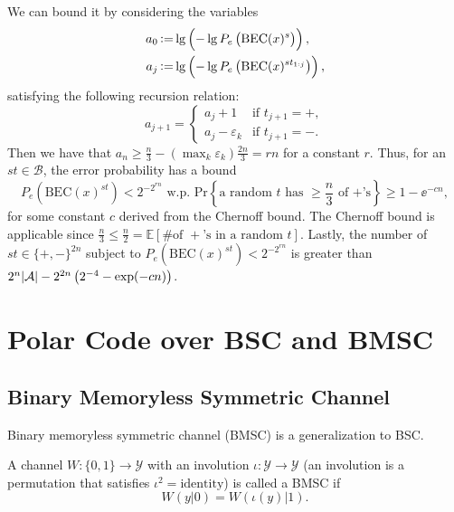 \begin{example}
    We can bound it by considering the variables
    \begin{equation}\begin{aligned}
        a_0 &\operatorname{\vcentcolon=} \lg\left(-\lg P_e\left(\mathrm{BEC}(x)^s\right)\right), \\
        a_j &\operatorname{\vcentcolon=} \lg\left(-\lg P_e\left(\mathrm{BEC}(x)^{st_{1:j}}\right)\right),
    \end{aligned}\end{equation}
    satisfying the following recursion relation:
    \begin{equation}
        a_{j+1} = \begin{cases}
            a_j + 1 &\text{if }t_{j+1}=+, \\
            a_j - \varepsilon_k &\text{if }t_{j+1}=-.
        \end{cases}
    \end{equation}
    Then we have that $a_n\ge\frac{n}{3} - (\max_k\varepsilon_k)\frac{2n}{3} = rn$ for a constant $r$. Thus, for an $st\in\mathcal{B}$, the error probability has a bound
    \begin{equation*}
        P_e\left(\mathrm{BEC}(x)^{st}\right) < 2^{-2^{rn}} \text{ w.p. }\mathrm{Pr}\left\{\text{a random $t$ has $\ge \frac{n}{3}$ of +'s}\right\} \ge 1-\ee^{-cn},
    \end{equation*}
    for some constant $c$ derived from the Chernoff bound. The Chernoff bound is applicable since $\frac{n}{3}\le \frac{n}{2} = \mathbb{E}[\text{\# of $+$'s in a random $t$}]$. Lastly, the number of $st\in\{+,-\}^{2n}$ subject to $P_e\left(\mathrm{BEC}(x)^{st}\right)<2^{-2^{rn}}$ is greater than $2^n\abs{\mathcal{A}} - 2^{2n}\left(2^{-4} - \exp(-cn)\right)$.
\end{example}

\section{Polar Code over BSC and BMSC}
\subsection{Binary Memoryless Symmetric Channel}
Binary memoryless symmetric channel (BMSC) is a generalization to BSC.
\begin{definition}[BMSC]
    A channel $W:\{0,1\}\rightarrow\mathcal{Y}$ with an involution $\iota:\mathcal{Y}\rightarrow\mathcal{Y}$ (an involution is a permutation that satisfies $\iota^2=\mathrm{identity}$) is called a BMSC if
    \begin{equation}
        W(y\vert0) = W(\iota(y)\vert 1).
    \end{equation}
\end{definition}

